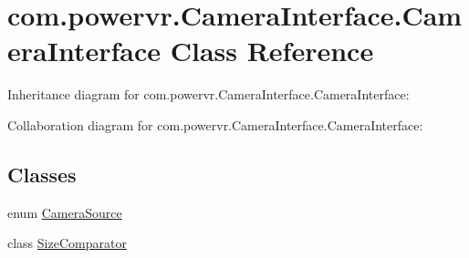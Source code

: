 \hypertarget{classcom_1_1powervr_1_1_camera_interface_1_1_camera_interface}{\section{com.\+powervr.\+Camera\+Interface.\+Camera\+Interface Class Reference}
\label{classcom_1_1powervr_1_1_camera_interface_1_1_camera_interface}
}


Inheritance diagram for com.\+powervr.\+Camera\+Interface.\+Camera\+Interface\+:


Collaboration diagram for com.\+powervr.\+Camera\+Interface.\+Camera\+Interface\+:
\subsection*{Classes}
\begin{DoxyCompactItemize}
\item 
enum \hyperlink{enumcom_1_1powervr_1_1_camera_interface_1_1_camera_interface_1_1_camera_source}{Camera\+Source}
\item 
class \hyperlink{classcom_1_1powervr_1_1_camera_interface_1_1_camera_interface_1_1_size_comparator}{Size\+Comparator}
\end{DoxyCompactItemize}
